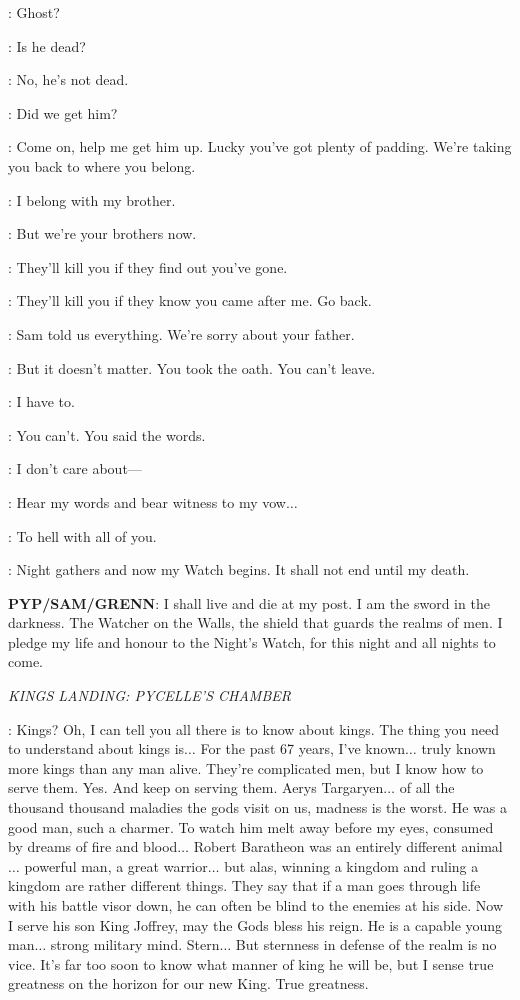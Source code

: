 \JON: Ghost? 

\GRENN: Is he dead? 

\PYP: No, he's not dead. 

\SAM: Did we get him? 

\PYP: Come on, help me get him up. Lucky you've got plenty of padding.  We're taking you back to where you belong. 

\JON: I belong with my brother. 

\SAM: But we're your brothers now. 

\GRENN: They'll kill you if they find out you've gone. 

\JON: They'll kill you if they know you came after me. Go back. 

\PYP: Sam told us everything. We're sorry about your father. 

\GRENN: But it doesn't matter. You took the oath. You can't leave. 

\JON: I have to. 

\GRENN: You can't. You said the words. 

\JON: I don't care about---

\SAM: Hear my words and bear witness to my vow$\ldots$ 

\JON: To hell with all of you. 

\PYP: Night gathers and now my Watch begins. It shall not end until my death. 

\textbf{PYP/SAM/GRENN}: I shall live and die at my post. I am the sword in the darkness. The Watcher on the Walls, the shield that guards the realms of men. I pledge my life and honour to the Night's Watch, for this night and all nights to come. 


\scene

\textit{KINGS LANDING: PYCELLE'S CHAMBER}


\PYCELLE: Kings? Oh, I can tell you all there is to know about kings. The thing you need to understand about kings is$\ldots$ For the past 67 years, I've known$\ldots$ truly known more kings than any man alive. They're complicated men, but I know how to serve them. Yes. And keep on serving them. Aerys Targaryen$\ldots$ of all the thousand thousand maladies the gods visit on us, madness is the worst. He was a good man, such a charmer. To watch him melt away before my eyes, consumed by dreams of fire and blood$\ldots$ Robert Baratheon was an entirely different animal$\ldots$ powerful man, a great warrior$\ldots$ but alas, winning a kingdom and ruling a kingdom are rather different things. They say that if a man goes through life with his battle visor down, he can often be blind to the enemies at his side. Now I serve his son King Joffrey, may the Gods bless his reign. He is a capable young man$\ldots$ strong military mind. Stern$\ldots$ But sternness in defense of the realm is no vice. It's far too soon to know what manner of king he will be, but I sense true greatness on the horizon for our new King. True greatness. 


